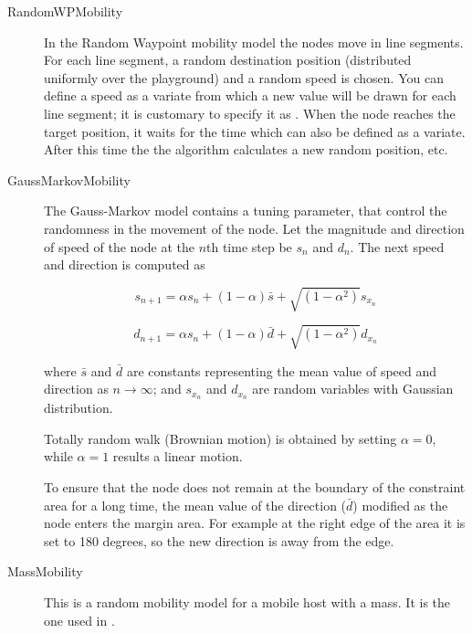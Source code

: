 \begin{description}

\item[RandomWPMobility]

In the Random Waypoint mobility model the nodes move in line segments. For each
line segment, a random destination position (distributed uniformly over the
playground) and a random speed is chosen. You can define a speed as a variate
from which a new value will be drawn for each line segment; it is customary to
specify it as . When the node reaches the
target position, it waits for the time  which can also be defined as a
variate. After this time the the algorithm calculates a new random position, etc.

\item[GaussMarkovMobility] The Gauss-Markov model contains a tuning
parameter, that control the randomness in the movement of the node.
Let the magnitude and direction of speed of the node at the $n$th time step be
$s_n$ and $d_n$. The next speed and direction is computed as

$$ s_{n+1} = \alpha s_n + (1 - \alpha) \bar{s} +
             \sqrt{(1-\alpha^2)} s_{x_n} $$

$$ d_{n+1} = \alpha s_n + (1 - \alpha) \bar{d} +
             \sqrt{(1-\alpha^2)} d_{x_n} $$

where $\bar{s}$ and $\bar{d}$ are constants representing the mean value
of speed and direction as $n \to \infty$; and $s_{x_n}$ and $d_{x_n}$
are random variables with Gaussian distribution.

Totally random walk (Brownian motion) is obtained by setting $\alpha=0$,
while $\alpha=1$ results a linear motion.

To ensure that the node does not remain at the boundary of the constraint
area for a long time, the mean value of the direction ($\bar{d}$) modified
as the node enters the margin area. For example at the right edge of the
area it is set to 180 degrees, so the new direction is away from the edge.


\item[MassMobility]

This is a random mobility model for a mobile host with
a mass. It is the one used in \cite{Perkins99optimizedsmooth}.


\end{description}
